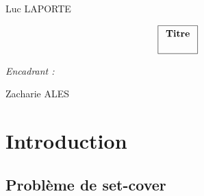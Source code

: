 \documentclass[12pt]{report}
\begin{document}
\pagestyle{fancyplain}
\renewcommand{\chaptermark}[1]{\markboth{\chaptername\ \thechapter. #1}{}}
\renewcommand{\sectionmark}[1]{\markright{\thesection. #1}}
\lhead[]{\fancyplain{}{\bfseries\leftmark}}
\rhead[]{\fancyplain{}{\bfseries\thepage}}
\cfoot{}

\makeatletter
\def\figurename{{\protect\sc \protect\small\bfseries Fig.}}
\def\f@ffrench{\protect\figurename\space{\protect\small\bf \thefigure}\space}
\let\fnum@figure\f@ffrench%
\let\captionORI\caption
\def\caption#1{\captionORI{\rm\small #1}}
\makeatother

\graphicspath{{img/}}

\thispagestyle{empty}
{\Large
\begin{center}
Luc LAPORTE
\vskip1cm


$$\fbox{$
  \begin{array}{c}
  \textbf{Titre}
  \vphantom{\int_\int}
  \end{array}
  $}
$$
\end{center}
\vskip8cm

\begin{flushright}
\textit{Encadrant :}

Zacharie ALES
\end{flushright}
}

\clearpage

\renewcommand{\baselinestretch}{1.30}\small \normalsize

\tableofcontents

\renewcommand{\baselinestretch}{1.18}\small \normalsize


\chapter{Introduction}

\section{Problème de set-cover}
\end{document}
